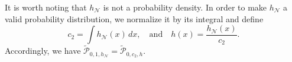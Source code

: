 \documentclass[accepted]{article}
\theoremstyle{plain} %
\theoremstyle{definition}
\theoremstyle{remark}
\newcommand{\HG}[1]{\textcolor{cyan}{[#1]}}
\begin{document}
It is worth noting that $h_\mathcal{N}$ is not a probability density. In order to make $h_{\mathcal{N}}$ a valid probability distribution, we normalize it by its integral and define
\[
c_2 = \int h_{\mathcal{N}}(x) \, dx, \quad \text{and} \quad h(x) = \frac{h_{\mathcal{N}}(x)}{c_2}.
\]
Accordingly, we have \( \tilde{\mathcal{P}}_{0,1,h_{\mathcal{N}}} = \tilde{\mathcal{P}}_{0,c_2,h} \). 
\end{document}
